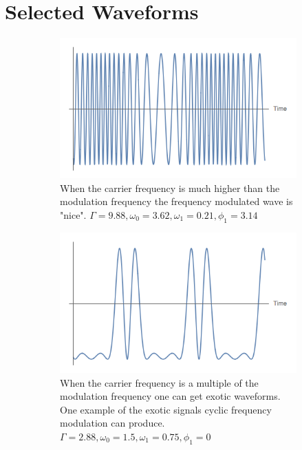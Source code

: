 \documentclass[onecolumn, groupedaddress, 10pt]{revtex4-1}
\begin{document}
\section{Selected Waveforms}
\begin{figure}[H]
	\centering
	\begin{subfigure}{.5\textwidth}
  		\centering
  		\includegraphics[width=.9\linewidth]{classicSignal.png}
  		\caption{When the carrier frequency is much higher than the modulation frequency the frequency modulated wave is "nice". $\Gamma = 9.88, \omega_0 = 3.62, \omega_1 = 0.21, \phi_1 = 3.14$ \label{fig:niceSignal}}
	\end{subfigure}%
	\begin{subfigure}{.5\textwidth}
  		\centering
  		\includegraphics[width=.9\linewidth]{interestingSignal.png}
  		\caption{When the carrier frequency is a multiple of the modulation frequency one can get exotic waveforms.  One example of the exotic signals cyclic frequency modulation can produce.  $\Gamma = 2.88, \omega_0 = 1.5, \omega_1 = 0.75, \phi_1 = 0$ \label{fig:interestingSignal}}
	\end{subfigure}
	\begin{subfigure}{.5\textwidth}

\end{subfigure}
\end{figure}
\end{document}
